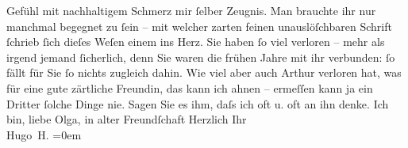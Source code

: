 \begin{ledgroupsized}[t]{13cm}
               Gefühl mit nachhaltigem Schmerz mir ſelber Zeugnis. Man brauchte ihr nur manchmal
               begegnet zu ſein – mit welcher zarten feinen unauslöſchbaren Schrift ſchrieb ſich
               dieſes Weſen einem ins Herz. Sie
               haben ſo viel {\pb}verloren – mehr als irgend jemand
               ſicherlich, denn Sie waren die frühen Jahre mit ihr verbunden: ſo fällt für Sie ſo
               nichts zugleich dahin.\pend
           \pstart
           Wie viel aber auch Arthur verloren hat, was für
               eine gute zärtliche Freundin, das kann ich ahnen – ermeſſen kann ja ein Dritter
               ſolche Dinge nie. Sagen Sie es ihm, daſs ich oft u. oft an ihn denke.\pend
           \pstart
           {\pb}Ich bin, liebe Olga, in alter Freundſchaft\pend
           \pstart
           Herzlich Ihr{\\[\baselineskip]}\spacefill\mbox{Hugo H.}\pend
           \leftskip=0em{}\endnumbering{}\end{ledgroupsized}  \newcommand{\dateiname}{L02340}\newcommand{\titel}{Hugo von Hofmannsthal an Olga Schnitzler, 17. 4. 1920}\newcommand{\editorInnen}{ Martin Anton Müller und Gerd-Hermann Susen}
      